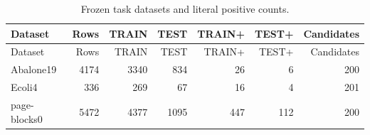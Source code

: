 \begin{longtable}{lrrrrrr}
\caption{Frozen task datasets and literal positive counts.}\label{tab:datasets}\\
\toprule
Dataset & Rows & TRAIN & TEST & TRAIN+ & TEST+ & Candidates \\
\midrule
\endfirsthead
\toprule
Dataset & Rows & TRAIN & TEST & TRAIN+ & TEST+ & Candidates \\
\midrule
\endhead
Abalone19 & 4174 & 3340 & 834 & 26 & 6 & 200 \\
Ecoli4 & 336 & 269 & 67 & 16 & 4 & 201 \\
page-blocks0 & 5472 & 4377 & 1095 & 447 & 112 & 200 \\
\bottomrule
\end{longtable}
